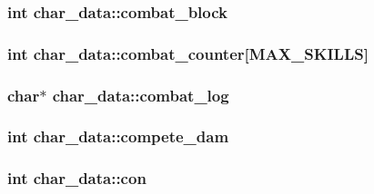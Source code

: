 \hypertarget{structchar__data_ac976542e022840cef9043bb0ca50b5e9}{
\subsubsection[{combat\-\_\-block}]{\setlength{\rightskip}{0pt plus 5cm}int char\-\_\-data\-::combat\-\_\-block}}\label{structchar__data_ac976542e022840cef9043bb0ca50b5e9}
\hypertarget{structchar__data_a55974ffbe7497a20a925af20f32c963e}{
\subsubsection[{combat\-\_\-counter}]{\setlength{\rightskip}{0pt plus 5cm}int char\-\_\-data\-::combat\-\_\-counter\mbox{[}{\bf M\-A\-X\-\_\-\-S\-K\-I\-L\-L\-S}\mbox{]}}}\label{structchar__data_a55974ffbe7497a20a925af20f32c963e}
\hypertarget{structchar__data_a170221ae1f9b1a525fab238c447fd3c4}{
\subsubsection[{combat\-\_\-log}]{\setlength{\rightskip}{0pt plus 5cm}char$\ast$ char\-\_\-data\-::combat\-\_\-log}}\label{structchar__data_a170221ae1f9b1a525fab238c447fd3c4}
\hypertarget{structchar__data_a000b4b9bc4f3707e65cd1881afae5b22}{
\subsubsection[{compete\-\_\-dam}]{\setlength{\rightskip}{0pt plus 5cm}int char\-\_\-data\-::compete\-\_\-dam}}\label{structchar__data_a000b4b9bc4f3707e65cd1881afae5b22}
\hypertarget{structchar__data_a95c70e068dbdba42c67e884dd955adf1}{
\subsubsection[{con}]{\setlength{\rightskip}{0pt plus 5cm}int char\-\_\-data\-::con}}\label{structchar__data_a95c70e068dbdba42c67e884dd955adf1}
